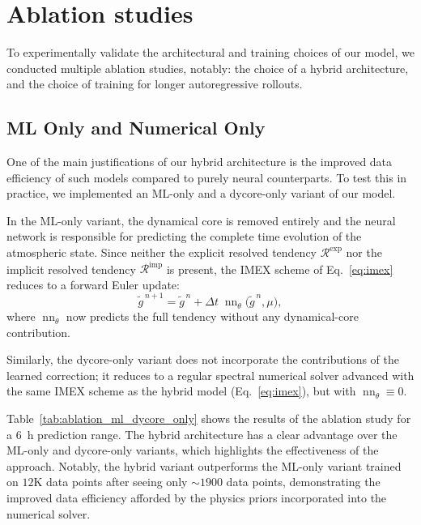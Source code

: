 \section{Ablation studies}

To experimentally validate the architectural and training choices of our model, we conducted multiple ablation studies, notably: the choice of a hybrid architecture, and the choice of training for longer autoregressive rollouts.

\subsection{ML Only and Numerical Only}

One of the main justifications of our hybrid architecture is the improved data efficiency of such models compared to purely neural counterparts. To test this in practice, we implemented an ML-only and a dycore-only variant of our model.

In the ML-only variant, the dynamical core is removed entirely and the neural network is responsible for predicting the complete time evolution of the atmospheric state. Since neither the explicit resolved tendency $\mathcal{R}^{\mathrm{exp}}$ nor the implicit resolved tendency $\mathcal{R}^{\mathrm{imp}}$ is present, the IMEX scheme of Eq.~\eqref{eq:imex} reduces to a forward Euler update:
\begin{equation}
    \widetilde{g}^{\,n+1} = \widetilde{g}^{\,n} + \Delta t \;\operatorname{nn}_\theta\!\bigl(\widetilde{g}^{\,n},\mu\bigr),
    \label{eq:ml_only_update}
\end{equation}
where $\operatorname{nn}_\theta$ now predicts the full tendency without any dynamical-core contribution.

Similarly, the dycore-only variant does not incorporate the contributions of the learned correction; it reduces to a regular spectral numerical solver advanced with the same IMEX scheme as the hybrid model (Eq.~\eqref{eq:imex}), but with $\operatorname{nn}_\theta \equiv 0$.

Table~\ref{tab:ablation_ml_dycore_only} shows the results of the ablation study for a 6~h prediction range. The hybrid architecture has a clear advantage over the ML-only and dycore-only variants, which highlights the effectiveness of the approach. Notably, the hybrid variant outperforms the ML-only variant trained on $12$K data points after seeing only $\sim\!1900$ data points, demonstrating the improved data efficiency afforded by the physics priors incorporated into the numerical solver.




